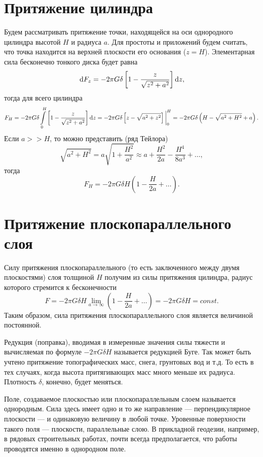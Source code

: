 \documentclass[11pt, a4paper]{article}
\theoremstyle{plain}
\theoremstyle{definition}
\theoremstyle{remark}
\begin{document}
\section{Притяжение цилиндра}
Будем рассматривать притяжение точки, находящейся на оси однородного цилиндра высотой $H$ и радиуса $a$. Для
простоты и приложений будем считать, что точка находится на верхней плоскости его основания ($z = H$).
Элементарная сила бесконечно тонкого диска будет равна
\begin{equation*}
    \dif F_z = -2\pi G\delta\left[ 1 - \dfrac{z}{\sqrt{z^2 + a^2}}\right] \dif z,
\end{equation*}
тогда для всего цилиндра
\begin{equation*}
    F_H = -2\pi G\delta\int\limits_{0}^{H}\left[ 1 - \dfrac{z}{\sqrt{z^2 + a^2}}\right] \dif z =
    -2\pi G\delta \left[ z - \sqrt{a^2 + z^2} \right] \bigg|_0^{H} =
    -2\pi G\delta\left( H - \sqrt{a^2 + H^2} + a \right).
\end{equation*}
Если $a >> H$, то можно представить (ряд Тейлора)
\begin{equation*}
    \sqrt{a^2 + H^2} = a\sqrt{1 + \dfrac{H^2}{a^2}} \approx
    a+\dfrac{H^2}{2a}-\dfrac{H^4}{8a^3}+\dots,
\end{equation*}
тогда
\begin{equation*}
    F_H = 
    -2\pi G\delta H\left( 1 - \dfrac{H}{2a} + \dots \right).
\end{equation*}

\section{Притяжение плоскопараллельного слоя}
Силу притяжения плоскопараллельного (то есть заключенного между двумя плоскостями) слоя толщиной $H$
получим из силы притяжения цилиндра, радиус которого стремится к бесконечности
\begin{equation*}
    F = 
    -2\pi G\delta H\lim\limits_{a\to\infty}\left( 1 - \dfrac{H}{2a} + \dots \right) = 
    -2\pi G\delta H = const.
\end{equation*}
Таким образом, сила притяжения плоскопараллельного слоя является величиной
постоянной. 

Редукция (поправка), вводимая в измеренные значения силы тяжести и вычисляемая по формуле $-2\pi
G\delta H$ называется редукцией Буге. Так может быть учтено притяжение топографических масс, снега,
грунтовых вод и т.д. То есть в тех случаях, когда высота притягивающих масс много меньше их радиуса.
Плотность $\delta$, конечно, будет меняться.

Поле, создаваемое плоскостью или плоскопараллельным слоем называется однородным. Сила здесь имеет одно и
то же направление --- перпендикулярное плоскости --- и одинаковую величину в любой точке. Уровенные
поверхности такого поля --- плоскости, параллельные слою. В прикладной геодезии, например, в
рядовых строительных работах, почти всегда предполагается, что работы проводятся именно в однородном поле.
\end{document}
